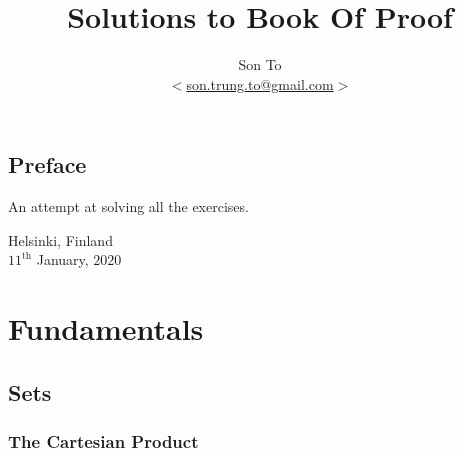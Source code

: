 \documentclass[a4paper,11pt]{memoir}
\title{Solutions to Book Of Proof}
\author{Son To\\
$<$\href{mailto:son.trung.to@gmail.com}{son.trung.to@gmail.com}$>$}
\affil{Fazer Oy, Arcada Ammattikorkeakoulu}
\theoremstyle{plain}        \newtheorem{id}{Lemma}[chapter]
\theoremstyle{definition}   \newtheorem{ex}{Exercise}[section]
\theoremstyle{remark}       \newtheorem{ab}{Conjecture}[section]
\begin{document}
  \maketitle
  \thispagestyle{empty}

  \frontmatter
   \chapter{Preface}
     An attempt at solving all the exercises.
     \begin{flushright}
       Helsinki, Finland \\$11^{\text{th}}$ January, $2020$
     \end{flushright}
   \clearpage
   \tableofcontents

   \mainmatter
   \part{Fundamentals}
   \chapter{Sets}
      
      \section{The Cartesian Product} %
\end{document}
